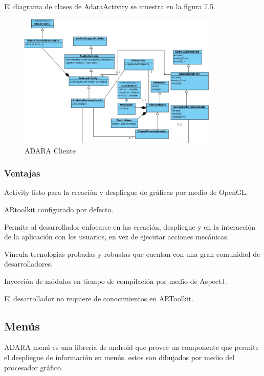 \documentclass[12pt,a4paper,spanish,openany]{book}
\begin{document}
El diagrama de clases de AdaraActivity se muestra en la figura 7.5.


\begin{figure}[ht]
\begin{center}
 \includegraphics[width=0.85\textwidth]{./img/clasesActivity.jpg}
\caption{ADARA Cliente}
\end{center}
\end{figure}







\subsubsection{Ventajas}

Activity listo para la creación y despliegue de gráficas por medio de OpenGL.

ARtoolkit configurado por defecto.

Permite al desarrollador enfocarse en las creación, despliegue  y en la
interacción de la aplicación con los usuarios, en vez de ejecutar acciones
mecánicas.

Vincula tecnologías probadas y robustas que cuentan con una gran comunidad de
desarrolladores.

Inyección de módulos en tiempo de compilación por medio de AspectJ. 

El desarrollador no requiere de conocimientos en ARToolkit.




\subsection{Menús}
ADARA menú es una librería de android que provee un componente que permite el
despliegue de información en menús, estos son dibujados por medio del procesador
gráfico.
\end{document}
